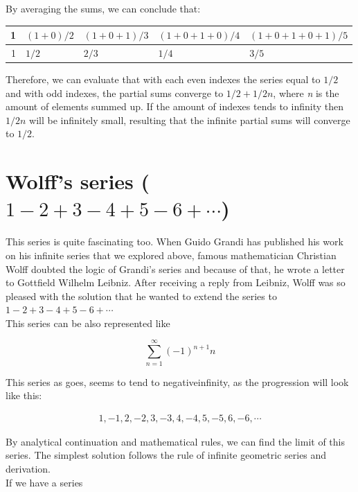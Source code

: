\documentclass[a4paper]{article}
\begin{document}
By averaging the sums, we can conclude that:

\begin{center}
\begin{tabular}{rllll}
1 & \((1+0)/2\) & \((1+0+1)/3\) & \((1+0+1+0)/4\) & \((1+0+1+0+1)/5\)\\
\hline
1 & \(1/2\) & \(2/3\) & \(1/4\) & \(3/5\)\\
\end{tabular}
\end{center}

Therefore, we can evaluate that with each even indexes the series equal to \(1/2\)
and with odd indexes, the partial sums converge to \(1/2+1/2n\), where \emph{n} is the
amount of elements summed up. If the amount of indexes tends to infinity then
\(1/2n\) will be infinitely small, resulting that the infinite partial sums will
converge to \(1/2\). 

\section{Wolff's series (\(1-2+3-4+5-6+\cdots\))}
\label{sec:orgee4d199}

This series is quite fascinating too. When Guido Grandi has published his work
on his infinite series that we explored above, famous mathematician Christian
Wolff doubted the logic of Grandi's series and because of that, he wrote a
letter to Gottfield Wilhelm Leibniz. After receiving a reply \cite{Wolff} from
Leibniz, Wolff was so pleased with the solution that he wanted to extend the
series to \(1-2+3-4+5-6+\cdots\) \\

This series can be also represented like

\begin{equation*}
\sum_{n=1}^\infty (-1)^{n+1}n 
\end{equation*}

This series as goes, seems to tend to negativeinfinity, as the
progression will look like this: 

\begin{align*}
1, -1, 2, -2, 3, -3, 4, -4, 5, -5, 6, -6, \cdots
\end{align*}

By analytical continuation and mathematical rules, we can find the limit of this
series. The simplest solution follows the rule of infinite geometric series and
derivation.\\

If we have a series
\end{document}
